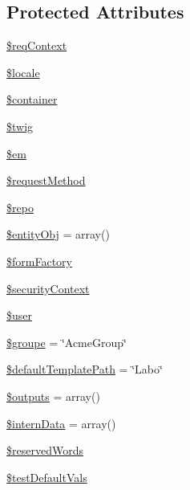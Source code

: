\subsection*{Protected Attributes}
\begin{DoxyCompactItemize}
\item 
\hyperlink{class_acme_group_1_1services_1_1out_puts3_1_1out_puts3_a83ba9b158c4432e83f4fdd9b4ac4277c}{\$req\+Context}
\item 
\hyperlink{class_acme_group_1_1services_1_1out_puts3_1_1out_puts3_a949e404cd2d57d57b3e711de08eb029f}{\$locale}
\item 
\hyperlink{class_acme_group_1_1services_1_1out_puts3_1_1out_puts3_a61003e5996a66b86646b8cb11282ef00}{\$container}
\item 
\hyperlink{class_acme_group_1_1services_1_1out_puts3_1_1out_puts3_a8b5306cdaa18606939b984848e1bdb35}{\$twig}
\item 
\hyperlink{class_acme_group_1_1services_1_1out_puts3_1_1out_puts3_a6967ef45ef6e39d15a91d60c72eef5f3}{\$em}
\item 
\hyperlink{class_acme_group_1_1services_1_1out_puts3_1_1out_puts3_aaf79766eee0f92c8f9eeb1e91f945ed0}{\$request\+Method}
\item 
\hyperlink{class_acme_group_1_1services_1_1out_puts3_1_1out_puts3_a793935508d1b464ada2d2d8a24804ff2}{\$repo}
\item 
\hyperlink{class_acme_group_1_1services_1_1out_puts3_1_1out_puts3_a47b50a5390989f9b14b2fcf5a07369cc}{\$entity\+Obj} = array()
\item 
\hyperlink{class_acme_group_1_1services_1_1out_puts3_1_1out_puts3_abb525cd194815ac0227194ac120a3800}{\$form\+Factory}
\item 
\hyperlink{class_acme_group_1_1services_1_1out_puts3_1_1out_puts3_a1499e59e29b60cc2bb686f6191b664c7}{\$security\+Context}
\item 
\hyperlink{class_acme_group_1_1services_1_1out_puts3_1_1out_puts3_a3b858cecd9006c3e2a9bff69cce4bf7f}{\$user}
\item 
\hyperlink{class_acme_group_1_1services_1_1out_puts3_1_1out_puts3_a776f087c83d32b2f66bda27cc60589f0}{\$groupe} = \char`\"{}Acme\+Group\char`\"{}
\item 
\hyperlink{class_acme_group_1_1services_1_1out_puts3_1_1out_puts3_a95268ebe6eb350bd9eecf7ea90269ff4}{\$default\+Template\+Path} = \char`\"{}Labo\char`\"{}
\item 
\hyperlink{class_acme_group_1_1services_1_1out_puts3_1_1out_puts3_a66b7a26f76f0ecc746d25ad58ec193c5}{\$outputs} = array()
\item 
\hyperlink{class_acme_group_1_1services_1_1out_puts3_1_1out_puts3_a5cc371a1cd030dbc96ee2d0d92bd4a87}{\$intern\+Data} = array()
\item 
\hyperlink{class_acme_group_1_1services_1_1out_puts3_1_1out_puts3_ac50fa794d942437fb1a867caa8ca8b98}{\$reserved\+Words}
\item 
\hyperlink{class_acme_group_1_1services_1_1out_puts3_1_1out_puts3_a47933923b5d18a1edc82626e9ef31a05}{\$test\+Default\+Vals}
\end{DoxyCompactItemize}


